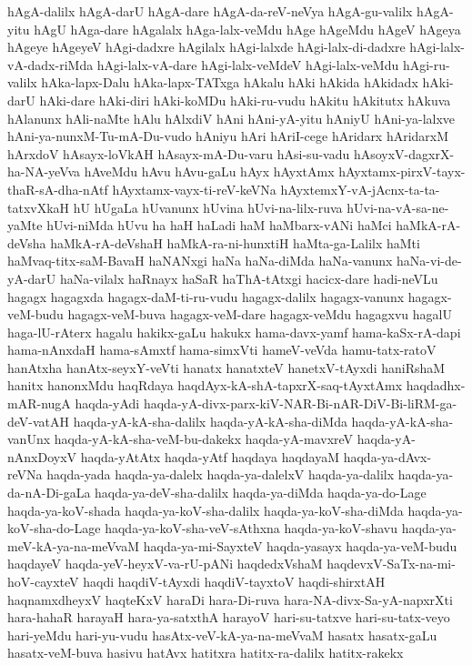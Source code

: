 {hAgA-dalilx
hAgA-darU
hAgA-dare
hAgA-da-reV-neVya
hAgA-gu-valilx
hAgA-yitu
hAgU
hAga-dare
hAgalalx
hAga-lalx-veMdu
hAge
hAgeMdu
hAgeV
hAgeya
hAgeye
hAgeyeV
hAgi-dadxre
hAgilalx
hAgi-lalxde
hAgi-lalx-di-dadxre
hAgi-lalx-vA-dadx-riMda
hAgi-lalx-vA-dare
hAgi-lalx-veMdeV
hAgi-lalx-veMdu
hAgi-ru-valilx
hAka-lapx-Dalu
hAka-lapx-TATxga
hAkalu
hAki
hAkida
hAkidadx
hAki-darU
hAki-dare
hAki-diri
hAki-koMDu
hAki-ru-vudu
hAkitu
hAkitutx
hAkuva
hAlanunx
hAli-naMte
hAlu
hAlxdiV
hAni
hAni-yA-yitu
hAniyU
hAni-ya-lalxve
hAni-ya-nunxM-Tu-mA-Du-vudo
hAniyu
hAri
hAriI-cege
hAridarx
hAridarxM
hArxdoV
hAsayx-loVkAH
hAsayx-mA-Du-varu
hAsi-su-vadu
hAsoyxV-dagxrX-ha-NA-yeVva
hAveMdu
hAvu
hAvu-gaLu
hAyx
hAyxtAmx
hAyxtamx-pirxV-tayx-thaR-sA-dha-nAtf
hAyxtamx-vayx-ti-reV-keVNa
hAyxtemxY-vA-jAcnx-ta-ta-tatxvXkaH
hU
hUgaLa
hUvanunx
hUvina
hUvi-na-lilx-ruva
hUvi-na-vA-sa-ne-yaMte
hUvi-niMda
hUvu
ha
haH
haLadi
haM
haMbarx-vANi
haMci
haMkA-rA-deVsha
haMkA-rA-deVshaH
haMkA-ra-ni-hunxtiH
haMta-ga-Lalilx
haMti
haMvaq-titx-saM-BavaH
haNANxgi
haNa
haNa-diMda
haNa-vanunx
haNa-vi-de-yA-darU
haNa-vilalx
haRnayx
haSaR
haThA-tAtxgi
hacicx-dare
hadi-neVLu
hagagx
hagagxda
hagagx-daM-ti-ru-vudu
hagagx-dalilx
hagagx-vanunx
hagagx-veM-budu
hagagx-veM-buva
hagagx-veM-dare
hagagx-veMdu
hagagxvu
hagalU
haga-lU-rAterx
hagalu
hakikx-gaLu
hakukx
hama-davx-yamf
hama-kaSx-rA-dapi
hama-nAnxdaH
hama-sAmxtf
hama-simxVti
hameV-veVda
hamu-tatx-ratoV
hanAtxha
hanAtx-seyxY-veVti
hanatx
hanatxteV
hanetxV-tAyxdi
haniRshaM
hanitx
hanonxMdu
haqRdaya
haqdAyx-kA-shA-tapxrX-saq-tAyxtAmx
haqdadhx-mAR-nugA
haqda-yAdi
haqda-yA-divx-parx-kiV-NAR-Bi-nAR-DiV-Bi-liRM-ga-deV-vatAH
haqda-yA-kA-sha-dalilx
haqda-yA-kA-sha-diMda
haqda-yA-kA-sha-vanUnx
haqda-yA-kA-sha-veM-bu-dakekx
haqda-yA-mavxreV
haqda-yA-nAnxDoyxV
haqda-yAtAtx
haqda-yAtf
haqdaya
haqdayaM
haqda-ya-dAvx-reVNa
haqda-yada
haqda-ya-dalelx
haqda-ya-dalelxV
haqda-ya-dalilx
haqda-ya-da-nA-Di-gaLa
haqda-ya-deV-sha-dalilx
haqda-ya-diMda
haqda-ya-do-Lage
haqda-ya-koV-shada
haqda-ya-koV-sha-dalilx
haqda-ya-koV-sha-diMda
haqda-ya-koV-sha-do-Lage
haqda-ya-koV-sha-veV-sAthxna
haqda-ya-koV-shavu
haqda-ya-meV-kA-ya-na-meVvaM
haqda-ya-mi-SayxteV
haqda-yasayx
haqda-ya-veM-budu
haqdayeV
haqda-yeV-heyxV-va-rU-pANi
haqdedxVshaM
haqdevxV-SaTx-na-mi-hoV-cayxteV
haqdi
haqdiV-tAyxdi
haqdiV-tayxtoV
haqdi-shirxtAH
haqnamxdheyxV
haqteKxV
haraDi
hara-Di-ruva
hara-NA-divx-Sa-yA-napxrXti
hara-hahaR
harayaH
hara-ya-satxthA
harayoV
hari-su-tatxve
hari-su-tatx-veyo
hari-yeMdu
hari-yu-vudu
hasAtx-veV-kA-ya-na-meVvaM
hasatx
hasatx-gaLu
hasatx-veM-buva
hasivu
hatAvx
hatitxra
hatitx-ra-dalilx
hatitx-rakekx
}

